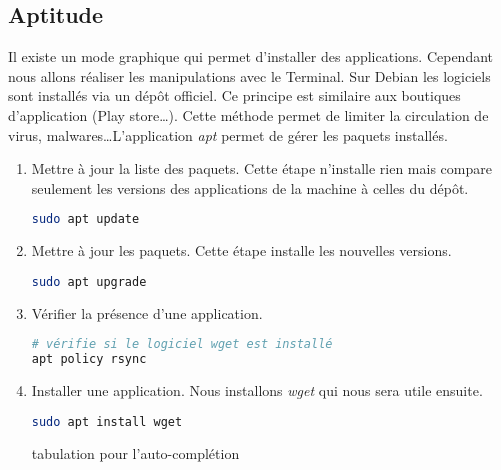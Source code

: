 \documentclass[a4paper,11pt]{article}
\begin{document}
\subsection{Aptitude}
Il existe un mode graphique qui permet d'installer des applications. Cependant nous allons réaliser les manipulations avec le Terminal. Sur Debian les logiciels sont installés via un dépôt officiel. Ce principe est similaire aux boutiques d'application (Play store\dots). Cette méthode permet de limiter la circulation de virus, malwares\dots L'application \emph{apt} permet de gérer les paquets installés.
\begin{activite}
\begin{enumerate}
    \item Mettre à jour la liste des paquets. Cette étape n'installe rien mais compare seulement les versions des applications de la machine à celles du dépôt.
    \begin{lstlisting}[language=bash]
sudo apt update
            \end{lstlisting}
    \item Mettre à jour les paquets. Cette étape installe les nouvelles versions.
    \begin{lstlisting}[language=bash]
sudo apt upgrade
            \end{lstlisting}
    \item Vérifier la présence d'une application.
    \begin{lstlisting}[language=bash]
# vérifie si le logiciel wget est installé
apt policy rsync
            \end{lstlisting}
    \item Installer une application. Nous installons \emph{wget} qui nous sera utile ensuite.
    \begin{lstlisting}[language=bash]
sudo apt install wget
            \end{lstlisting}
            \begin{commentprof}
            tabulation pour l'auto-complétion
            \end{commentprof}
\end{enumerate}
\end{activite}
\end{document}
